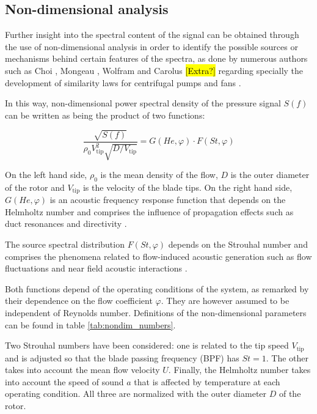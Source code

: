 \subsection{Non-dimensional analysis}

Further insight into the spectral content of the signal can be obtained through the use of non-dimensional analysis in order to identify the possible sources or mechanisms behind certain features of the spectra, as done by numerous authors such as Choi \cite{choi1994aerodynamic,choi2003experiments}, Mongeau \cite{mongeau1993sound,mongeau1995method}, Wolfram \cite{wolfram2009detection,wolfram2010experimental} and Carolus \cite{carolus2000experimental} \hl{[Extra?]} regarding specially the development of similarity laws for centrifugal pumps and fans \cite{neise1982acoustic}.

In this way, non-dimensional power spectral density of the pressure signal $S(f)$ can be written \cite{mongeau1993sound,choi1994aerodynamic} as being the product of two functions: 

\begin{equation}\label{eq:non-dim_spectra}
	\frac{\sqrt{S(f)}}{\rho_0 V^2_\text{tip}\sqrt{D/V_\text{tip}}}=
	G(He,\varphi)\cdot F(St,\varphi)
\end{equation}

On the left hand side, $\rho_0$ is the mean density of the flow, $D$ is the outer diameter of the rotor and $V_\text{tip}$ is the velocity of the blade tips. On the right hand side, $G(He,\varphi)$ is an acoustic frequency response function that depends on the Helmholtz number and comprises the influence of propagation effects such as duct resonances and directivity \cite{mongeau1993sound,wolfram2009detection}. 

The source spectral distribution $F(St,\varphi)$ depends on the Strouhal number and comprises the phenomena related to flow-induced acoustic generation such as flow fluctuations and near field acoustic interactions \cite{mongeau1995method}.

Both functions depend of the operating conditions of the system, as remarked by their dependence on the flow coefficient $\varphi$. They are however assumed to be independent of Reynolds number. Definitions of the non-dimensional parameters can be found in table \ref{tab:nondim_numbers}. 

Two Strouhal numbers have been considered: one is related to the tip speed $V_\text{tip}$ and is adjusted so that the blade passing frequency (BPF) has $St=1$. The other takes into account the mean flow velocity $U$. Finally, the Helmholtz number takes into account the speed of sound $a$ that is affected by temperature at each operating condition. All three are normalized with the outer diameter $D$ of the rotor.


